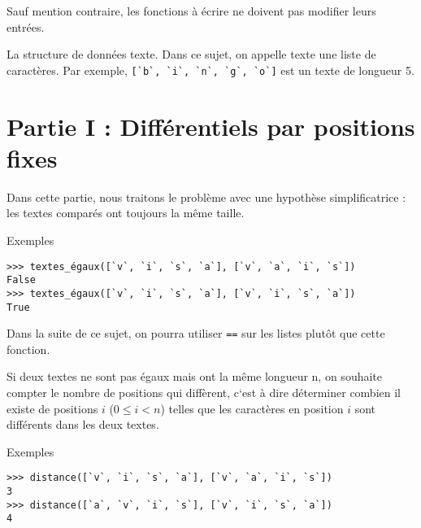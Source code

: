 Sauf mention contraire, les fonctions à écrire ne doivent pas modifier leurs entrées.



La structure de données texte. Dans ce sujet, on appelle texte une liste de caractères. Par
exemple, \lstinline{[`b`, `i`, `n`, `g`, `o`]} est un texte de longueur 5.


\section*{Partie I : Différentiels par positions fixes}
Dans cette partie, nous traitons le problème avec une hypothèse simplificatrice : les textes
comparés ont toujours la même taille.


Exemples
\begin{lstlisting}
>>> textes_égaux([`v`, `i`, `s`, `a`], [`v`, `a`, `i`, `s`])
False
>>> textes_égaux([`v`, `i`, `s`, `a`], [`v`, `i`, `s`, `a`])
True
\end{lstlisting}

Dans la suite de ce sujet, on pourra utiliser \lstinline{==} sur les listes plutôt que cette fonction.


Si deux textes ne sont pas égaux mais ont la même longueur n, on souhaite compter le nombre
de positions qui diffèrent, c`est à dire déterminer combien il existe de positions $i$ ($0\leq i < n$)
telles que les caractères en position $i$ sont différents dans les deux textes.


Exemples
\begin{lstlisting}
>>> distance([`v`, `i`, `s`, `a`], [`v`, `a`, `i`, `s`])
3
>>> distance([`a`, `v`, `i`, `s`], [`v`, `i`, `s`, `a`])
4
\end{lstlisting}



